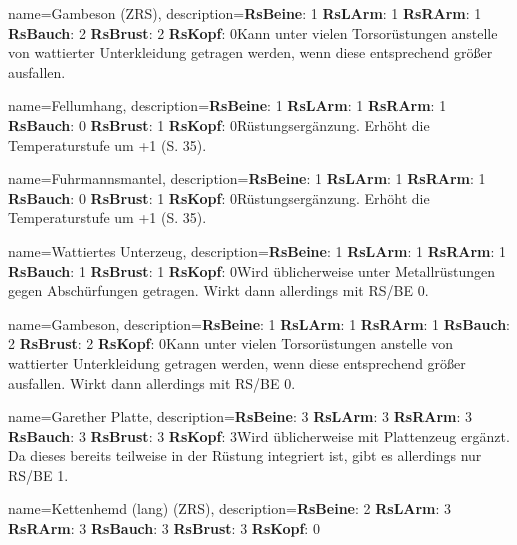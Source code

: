 {
    name={Gambeson (ZRS)},
    description={\textbf{RsBeine}: 1 \textbf{RsLArm}: 1 \textbf{RsRArm}: 1 \textbf{RsBauch}: 2 \textbf{RsBrust}: 2 \textbf{RsKopf}: 0\newline Kann unter vielen Torsorüstungen anstelle von wattierter Unterkleidung getragen werden, wenn diese entsprechend größer ausfallen.}
}


{
    name={Fellumhang},
    description={\textbf{RsBeine}: 1 \textbf{RsLArm}: 1 \textbf{RsRArm}: 1 \textbf{RsBauch}: 0 \textbf{RsBrust}: 1 \textbf{RsKopf}: 0\newline Rüstungsergänzung. Erhöht die Temperaturstufe um +1 (S. 35).}
}


{
    name={Fuhrmannsmantel},
    description={\textbf{RsBeine}: 1 \textbf{RsLArm}: 1 \textbf{RsRArm}: 1 \textbf{RsBauch}: 0 \textbf{RsBrust}: 1 \textbf{RsKopf}: 0\newline Rüstungsergänzung. Erhöht die Temperaturstufe um +1 (S. 35).}
}


{
    name={Wattiertes Unterzeug},
    description={\textbf{RsBeine}: 1 \textbf{RsLArm}: 1 \textbf{RsRArm}: 1 \textbf{RsBauch}: 1 \textbf{RsBrust}: 1 \textbf{RsKopf}: 0\newline Wird üblicherweise unter Metallrüstungen gegen Abschürfungen getragen. Wirkt dann allerdings mit RS/BE 0.}
}


{
    name={Gambeson},
    description={\textbf{RsBeine}: 1 \textbf{RsLArm}: 1 \textbf{RsRArm}: 1 \textbf{RsBauch}: 2 \textbf{RsBrust}: 2 \textbf{RsKopf}: 0\newline Kann unter vielen Torsorüstungen anstelle von wattierter Unterkleidung getragen werden, wenn diese entsprechend größer ausfallen. Wirkt dann allerdings mit RS/BE 0.}
}


{
    name={Garether Platte},
    description={\textbf{RsBeine}: 3 \textbf{RsLArm}: 3 \textbf{RsRArm}: 3 \textbf{RsBauch}: 3 \textbf{RsBrust}: 3 \textbf{RsKopf}: 3\newline Wird üblicherweise mit Plattenzeug ergänzt. Da dieses bereits teilweise in der Rüstung integriert ist, gibt es allerdings nur RS/BE 1.}
}


{
    name={Kettenhemd (lang) (ZRS)},
    description={\textbf{RsBeine}: 2 \textbf{RsLArm}: 3 \textbf{RsRArm}: 3 \textbf{RsBauch}: 3 \textbf{RsBrust}: 3 \textbf{RsKopf}: 0\newline }
}


